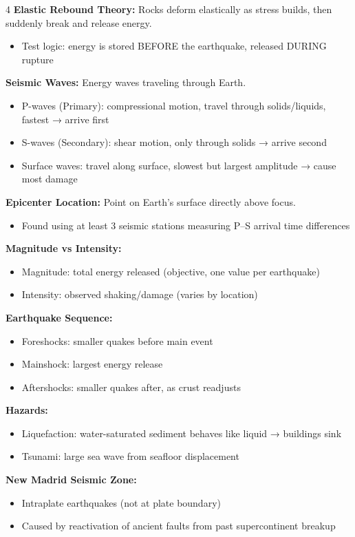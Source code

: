 \documentclass[10pt]{article}
\begin{document}
\begin{multicols}{4}
\textbf{Elastic Rebound Theory:}
Rocks deform elastically as stress builds, then suddenly break and release energy.
\begin{itemize}
\item Test logic: energy is stored BEFORE the earthquake, released DURING rupture
\end{itemize}

\textbf{Seismic Waves:}
Energy waves traveling through Earth.
\begin{itemize}
\item P-waves (Primary): compressional motion, travel through solids/liquids, fastest → arrive first
\item S-waves (Secondary): shear motion, only through solids → arrive second
\item Surface waves: travel along surface, slowest but largest amplitude → cause most damage
\end{itemize}

\textbf{Epicenter Location:}
Point on Earth's surface directly above focus.
\begin{itemize}
\item Found using at least 3 seismic stations measuring P–S arrival time differences
\end{itemize}

\textbf{Magnitude vs Intensity:}
\begin{itemize}
\item Magnitude: total energy released (objective, one value per earthquake)
\item Intensity: observed shaking/damage (varies by location)
\end{itemize}

\textbf{Earthquake Sequence:}
\begin{itemize}
\item Foreshocks: smaller quakes before main event
\item Mainshock: largest energy release
\item Aftershocks: smaller quakes after, as crust readjusts
\end{itemize}

\textbf{Hazards:}
\begin{itemize}
\item Liquefaction: water-saturated sediment behaves like liquid → buildings sink
\item Tsunami: large sea wave from seafloor displacement
\end{itemize}

\textbf{New Madrid Seismic Zone:}
\begin{itemize}
\item Intraplate earthquakes (not at plate boundary)
\item Caused by reactivation of ancient faults from past supercontinent breakup
\end{itemize}


\end{multicols}
\end{document}

